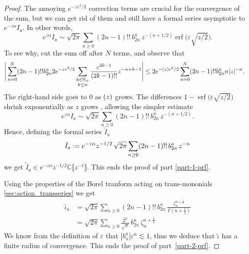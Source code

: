\documentclass{article}
\let\Re\relax
\DeclareMathOperator{\Re}{Re}
\newcommand{\C}{\mathbb{C}}
\newcommand{\series}[1]{\tilde{#1}}
\newcommand*{\defeq}{\mathrel{\vcenter{\baselineskip0.5ex \lineskiplimit0pt
                     \hbox{\scriptsize.}\hbox{\scriptsize.}}}%
                     =}
\theoremstyle{definition}
\theoremstyle{plain}
\begin{document}
\begin{proof}
The annoying $e^{-z\varepsilon^2/2}$ correction terms are crucial for the convergence of the sum, but we can get rid of them and still have a formal series asymptotic to $e^{-z \alpha} I_a$. In other words,
\[ e^{z \alpha} I_a \sim \sqrt{2\pi} \sum_{n \ge 0} (2n-1)!!\,b_{2n}^a\,z^{-(n+1/2)} \operatorname{erf}\big(\varepsilon \sqrt{z/2}\big). \]
To see why, cut the sum off after $N$ terms, and observe that
\begin{align*}
  \Bigg | \sum_{n= 0}^N(2n-1)!! b_{2n}^a  2e^{-z\varepsilon^2/2} \sum_{\substack{k \in \mathbb{N}_+ \\ k \le n}} \frac{\varepsilon^{2k-1}}{(2k-1)!!} z^{-n+k-1} \Bigg | &\leq  2 e^{-\Re (z) \varepsilon^2/2} \sum_{n=0}^N(2n-1)!! b_{2n}^a n|z|^{-n}.
\end{align*}
The right-hand side goes to $0$ as $\Re(z)$ grows.
The differences $1 - \operatorname{erf}\big(\varepsilon \sqrt{z/2}\big)$ shrink exponentially as $z$ grows \cite[inequality~5]{chiani-dardari-book}, allowing the simpler estimate
\[ e^{z\alpha} I_a \sim \sqrt{2\pi} \sum_{n \ge 0} (2n-1)!!\, b_{2n}^a \,z^{-(n+1/2)}. \]
Hence, defining the formal series $\series{I}_a$
\[\series{I}_a \defeq e^{-z\alpha} z^{-1/2}\, \sqrt{2\pi} \sum_{n \ge 0} (2n-1)!!\, b_{2n}^a \,z^{-n}\]
we get $\series{I}_a \in e^{-z\alpha}z^{-1/2}\C\llbracket z^{-1}\rrbracket$. This ends the proof of part \ref{part-1-prf}.

Using the properties of the Borel tranform acting on trans-mononials \ref{sec:action_transseries} we get 
\begin{align*}
\series{\iota}_a & = \sqrt{2\pi} \sum_{n \ge 0} (2n - 1)!! \,b_{2n}^a\,\frac{\zeta_\alpha^{n+\tfrac{1}{2}}}{\Gamma(n+\tfrac{1}{2})} \\
&= \sqrt{2\pi} \sum_{n \ge 0} \frac{2^n}{\sqrt{\pi}} \,b_{2n}^a\,\zeta_\alpha^{n+\tfrac{1}{2}}
\end{align*}
We know from the definition of $\varepsilon$ that $\left|b_n^a\right| \varepsilon^n \lesssim 1$, thus we deduce that $\series{\iota}$ has a finite radius of convergence. This ends the proof of part~\ref{part-2-prf}. %


\end{proof}
\end{document}
